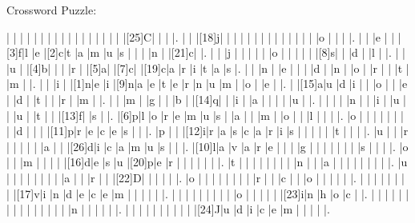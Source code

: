 \documentclass[12pt]{article}
\begin{document}
\libertine
\renewcommand\PuzzleClueFont{\rm\normalsize}
\begin{center}
  \huge{Crossword Puzzle:}
\end{center}
\vspace{1.5cm}
\begin{Puzzle}{22}{24}
  |{}  |{}  |{}  |{}  |{}  |{}  |{}  |{}  |{}  |{}  |{}  |{}  |{}  |{}  |{}  |{}  |{}  |[25]C|{}  |{}  |{}  |.
  |{}  |{}  |[18]j|{}  |{}  |{}  |{}  |{}  |{}  |{}  |{}  |{}  |{}  |{}  |{}  |{}  |{}  |o   |{}  |{}  |{}  |.
  |{}  |{}  |e   |{}  |{}  |[3]f|l   |e   |[2]c|t   |a   |m   |u   |s   |{}  |{}  |{}  |n   |{}  |[21]c|{}  |.
  |{}  |{}  |j   |{}  |{}  |{}  |{}  |{}  |o   |{}  |{}  |{}  |{}  |{}  |[8]s|{}  |{}  |d   |{}  |l   |{}  |.
  |{}  |{}  |u   |{}  |[4]b|{}  |{}  |{}  |r   |{}  |[5]a|{}  |[7]c|{}  |[19]c|a   |r   |i   |t   |a   |s   |.
  |{}  |{}  |n   |{}  |e   |{}  |{}  |{}  |d   |{}  |n   |{}  |o   |{}  |r   |{}  |{}  |t   |{}  |m   |{}  |.
  |{}  |{}  |i   |{}  |[1]n|e   |i   |[9]n|a   |e   |t   |e   |r   |n   |u   |m   |{}  |o   |{}  |e   |{}  |.
  |{}  |[15]a|u   |d   |i   |{}  |{}  |o   |{}  |{}  |e   |{}  |d   |{}  |t   |{}  |{}  |r   |{}  |m   |{}  |.
  |{}  |{}  |m   |{}  |g   |{}  |{}  |b   |{}  |[14]q|{}  |{}  |i   |{}  |a   |{}  |{}  |{}  |{}  |u   |{}  |.
  |{}  |{}  |{}  |{}  |n   |{}  |{}  |i   |{}  |u   |{}  |{}  |u   |{}  |t   |{}  |{}  |[13]f|{}  |s   |{}  |.
  |[6]p|l   |o   |r   |e   |m   |u   |s   |{}  |a   |{}  |{}  |m   |{}  |o   |{}  |{}  |l   |{}  |{}  |{}  |.
  |o   |{}  |{}  |{}  |{}  |{}  |{}  |{}  |{}  |d   |{}  |{}  |{}  |[11]p|r   |e   |c   |e   |s   |{}  |{}  |.
  |p   |{}  |{}  |[12]i|r   |a   |s   |c   |a   |r   |i   |s   |{}  |{}  |{}  |{}  |{}  |t   |{}  |{}  |{}  |.
  |u   |{}  |{}  |r   |{}  |{}  |{}  |{}  |{}  |a   |{}  |{}  |[26]d|i   |c   |a   |m   |u   |s   |{}  |{}  |.
  |[10]l|a   |v   |a   |r   |e   |{}  |{}  |{}  |g   |{}  |{}  |{}  |{}  |{}  |{}  |{}  |s   |{}  |{}  |{}  |.
  |o   |{}  |{}  |m   |{}  |{}  |{}  |{}  |[16]d|e   |s   |u   |[20]p|e   |r   |{}  |{}  |{}  |{}  |{}  |{}  |.
  |t   |{}  |{}  |{}  |{}  |{}  |{}  |{}  |{}  |n   |{}  |{}  |a   |{}  |{}  |{}  |{}  |{}  |{}  |{}  |{}  |.
  |u   |{}  |{}  |{}  |{}  |{}  |{}  |{}  |{}  |a   |{}  |{}  |r   |{}  |{}  |[22]D|{}  |{}  |{}  |{}  |{}  |.
  |o   |{}  |{}  |{}  |{}  |{}  |{}  |{}  |{}  |r   |{}  |{}  |c   |{}  |{}  |o   |{}  |{}  |{}  |{}  |{}  |.
  |{}  |{}  |{}  |{}  |{}  |{}  |{}  |{}  |[17]v|i   |n   |d   |e   |c   |e   |m   |{}  |{}  |{}  |{}  |{}  |.
  |{}  |{}  |{}  |{}  |{}  |{}  |{}  |{}  |{}  |o   |{}  |{}  |{}  |{}  |{}  |[23]i|n   |h   |o   |c   |{}  |.
  |{}  |{}  |{}  |{}  |{}  |{}  |{}  |{}  |{}  |{}  |{}  |{}  |{}  |{}  |{}  |n   |{}  |{}  |{}  |{}  |{}  |.
  |{}  |{}  |{}  |{}  |{}  |{}  |{}  |{}  |{}  |{}  |[24]J|u   |d   |i   |c   |e   |m   |{}  |{}  |{}  |{}  |.
\end{Puzzle}
\end{document}
